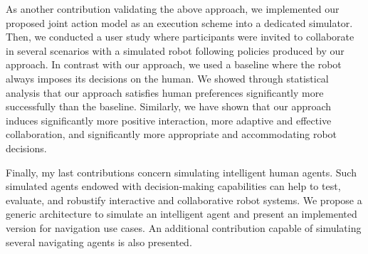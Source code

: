 As another contribution validating the above approach, we implemented our proposed joint action model as an execution scheme into a dedicated simulator. Then, we conducted a user study where participants were invited to collaborate in several scenarios with a simulated robot following policies produced by our approach. In contrast with our approach, we used a baseline where the robot always imposes its decisions on the human. We showed through statistical analysis that our approach satisfies human preferences significantly more successfully than the baseline. Similarly, we have shown that our approach induces significantly more positive interaction, more adaptive and effective collaboration, and significantly more appropriate and accommodating robot decisions.

Finally, my last contributions concern simulating intelligent human agents. Such simulated agents endowed with decision-making capabilities can help to test, evaluate, and robustify interactive and collaborative robot systems. We propose a generic architecture to simulate an intelligent agent and present an implemented version for navigation use cases. An additional contribution capable of simulating several navigating agents is also presented.  
